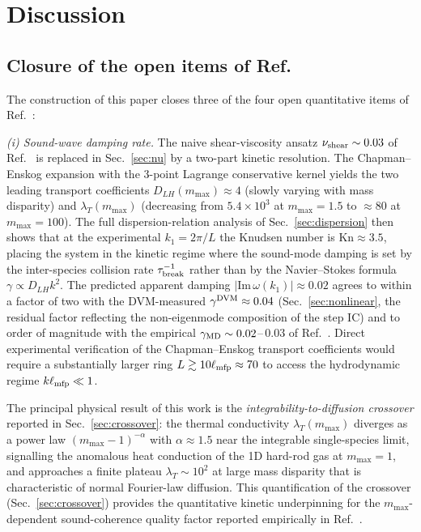\documentclass[aps,pre,twocolumn,superscriptaddress,longbibliography,floatfix]{revtex4-2}
\begin{document}
\section{Discussion}\label{sec:discussion}

\subsection{Closure of the open items of Ref.~\cite{PaperIV}}

The construction of this paper closes three of the four open
quantitative items of Ref.~\cite{PaperIV}:

\emph{(i) Sound-wave damping rate.} The naive
shear-viscosity ansatz $\nu_{\rm shear}\sim 0.03$ of
Ref.~\cite{PaperIV} is replaced in Sec.~\ref{sec:nu} by a
two-part kinetic resolution. The Chapman--Enskog expansion
with the 3-point Lagrange conservative kernel yields the
two leading transport coefficients
$D_{LH}(m_{\max})\approx 4$ (slowly varying with mass
disparity) and $\lambda_T(m_{\max})$ (decreasing from
$5.4\times 10^3$ at $m_{\max}=1.5$ to $\approx 80$ at
$m_{\max}=100$). The full dispersion-relation analysis of
Sec.~\ref{sec:dispersion} then shows that at the
experimental $k_1=2\pi/L$ the Knudsen number is
$\mathrm{Kn}\approx 3.5$, placing the system in the
kinetic regime where the sound-mode damping is set by the
inter-species collision rate $\tau_{\rm break}^{-1}$ rather
than by the Navier--Stokes formula
$\gamma\propto D_{LH}k^2$. The predicted apparent damping
$|\mathrm{Im}\,\omega(k_1)|\approx 0.02$ agrees to within
a factor of two with the DVM-measured
$\gamma^{\rm DVM}\approx 0.04$ (Sec.~\ref{sec:nonlinear},
the residual factor reflecting the non-eigenmode
composition of the step IC) and to order of magnitude with
the empirical
$\gamma_{\rm MD}\sim 0.02$--$\,0.03$ of Ref.~\cite{PaperII}.
Direct experimental verification of the Chapman--Enskog
transport coefficients would require a substantially larger
ring $L\gtrsim 10\ell_{\rm mfp}\approx 70$ to access the
hydrodynamic regime $k\ell_{\rm mfp}\ll 1$.

The principal physical result of this work is the
\emph{integrability-to-diffusion crossover} reported in
Sec.~\ref{sec:crossover}: the thermal conductivity
$\lambda_T(m_{\max})$ diverges as a power law
$(m_{\max}-1)^{-\alpha}$ with $\alpha\approx 1.5$
near the integrable single-species limit, signalling the
anomalous heat conduction of the 1D hard-rod gas at
$m_{\max}=1$, and approaches a finite plateau
$\lambda_T\sim 10^2$ at large mass disparity that is
characteristic of normal Fourier-law diffusion. This
quantification of the crossover (Sec.~\ref{sec:crossover})
provides the
quantitative kinetic underpinning for the
$m_{\max}$-dependent sound-coherence quality factor
reported empirically in Ref.~\cite{PaperII}.
\end{document}
